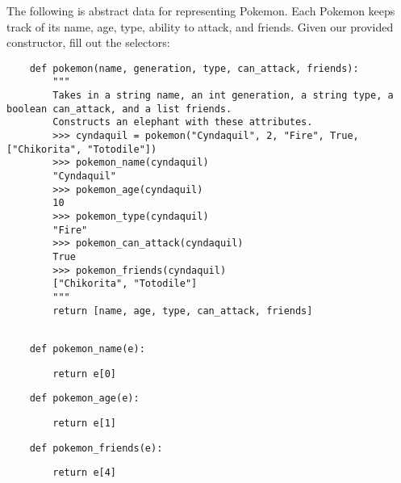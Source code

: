 \begin{blocksection}
    \question The following is abstract data for representing Pokemon.
    Each Pokemon keeps track of its name, age, type, ability to attack, and friends. Given
    our provided constructor, fill out the selectors:
    
    \begin{lstlisting}
    def pokemon(name, generation, type, can_attack, friends):
        """
        Takes in a string name, an int generation, a string type, a boolean can_attack, and a list friends.
        Constructs an elephant with these attributes.
        >>> cyndaquil = pokemon("Cyndaquil", 2, "Fire", True, ["Chikorita", "Totodile"])
        >>> pokemon_name(cyndaquil)
        "Cyndaquil"
        >>> pokemon_age(cyndaquil)
        10
        >>> pokemon_type(cyndaquil)
        "Fire"
        >>> pokemon_can_attack(cyndaquil)
        True
        >>> pokemon_friends(cyndaquil)
        ["Chikorita", "Totodile"]
        """
        return [name, age, type, can_attack, friends]
    
    \end{lstlisting}
    
    \end{blocksection}
    \begin{blocksection}
    
    \begin{lstlisting}
    def pokemon_name(e):
    \end{lstlisting}
    \begin{solution}[1in]
    \begin{lstlisting}
        return e[0]
    \end{lstlisting}
    \end{solution}
    \end{blocksection}
    \begin{blocksection}
    
    \begin{lstlisting}
    def pokemon_age(e):
    \end{lstlisting}
    \begin{solution}[1in]
    \begin{lstlisting}
        return e[1]
    \end{lstlisting}
    \end{solution}
    \end{blocksection}
    \begin{blocksection}
    
    \begin{lstlisting}
    def pokemon_friends(e):
    \end{lstlisting}
    \begin{solution}[1in]
    \begin{lstlisting}
        return e[4]
    \end{lstlisting}
    \end{solution}
    \end{blocksection}
    

